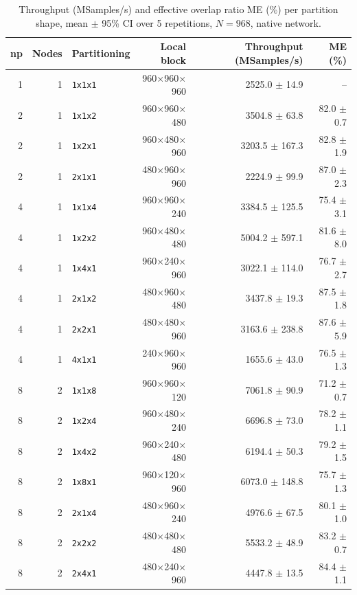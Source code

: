 \begin{longtable}{rrlrrr}
\caption{Throughput (MSamples/s) and effective overlap ratio ME (\%) per partition shape, mean $\pm$ 95\% CI over 5 repetitions, $N = 968$, native network.}\label{tab:strongscale}\\
\toprule
np & Nodes & Partitioning & Local block & Throughput (MSamples/s) & ME (\%) \\
\midrule
\endhead
1 & 1 & \texttt{1x1x1} & 960$\times$960$\times$960 & 2525.0 $\pm$ 14.9 & -- \\
2 & 1 & \texttt{1x1x2} & 960$\times$960$\times$480 & 3504.8 $\pm$ 63.8 & 82.0 $\pm$ 0.7 \\
2 & 1 & \texttt{1x2x1} & 960$\times$480$\times$960 & 3203.5 $\pm$ 167.3 & 82.8 $\pm$ 1.9 \\
2 & 1 & \texttt{2x1x1} & 480$\times$960$\times$960 & 2224.9 $\pm$ 99.9 & 87.0 $\pm$ 2.3 \\
4 & 1 & \texttt{1x1x4} & 960$\times$960$\times$240 & 3384.5 $\pm$ 125.5 & 75.4 $\pm$ 3.1 \\
4 & 1 & \texttt{1x2x2} & 960$\times$480$\times$480 & 5004.2 $\pm$ 597.1 & 81.6 $\pm$ 8.0 \\
4 & 1 & \texttt{1x4x1} & 960$\times$240$\times$960 & 3022.1 $\pm$ 114.0 & 76.7 $\pm$ 2.7 \\
4 & 1 & \texttt{2x1x2} & 480$\times$960$\times$480 & 3437.8 $\pm$ 19.3 & 87.5 $\pm$ 1.8 \\
4 & 1 & \texttt{2x2x1} & 480$\times$480$\times$960 & 3163.6 $\pm$ 238.8 & 87.6 $\pm$ 5.9 \\
4 & 1 & \texttt{4x1x1} & 240$\times$960$\times$960 & 1655.6 $\pm$ 43.0 & 76.5 $\pm$ 1.3 \\
8 & 2 & \texttt{1x1x8} & 960$\times$960$\times$120 & 7061.8 $\pm$ 90.9 & 71.2 $\pm$ 0.7 \\
8 & 2 & \texttt{1x2x4} & 960$\times$480$\times$240 & 6696.8 $\pm$ 73.0 & 78.2 $\pm$ 1.1 \\
8 & 2 & \texttt{1x4x2} & 960$\times$240$\times$480 & 6194.4 $\pm$ 50.3 & 79.2 $\pm$ 1.5 \\
8 & 2 & \texttt{1x8x1} & 960$\times$120$\times$960 & 6073.0 $\pm$ 148.8 & 75.7 $\pm$ 1.3 \\
8 & 2 & \texttt{2x1x4} & 480$\times$960$\times$240 & 4976.6 $\pm$ 67.5 & 80.1 $\pm$ 1.0 \\
8 & 2 & \texttt{2x2x2} & 480$\times$480$\times$480 & 5533.2 $\pm$ 48.9 & 83.2 $\pm$ 0.7 \\
8 & 2 & \texttt{2x4x1} & 480$\times$240$\times$960 & 4447.8 $\pm$ 13.5 & 84.4 $\pm$ 1.1 \\

\end{longtable}
